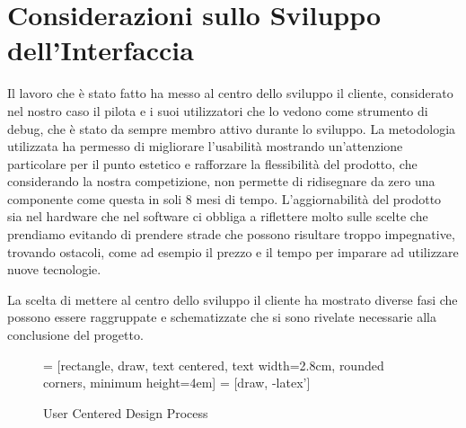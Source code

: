 \newpage


\section{Considerazioni sullo Sviluppo dell'Interfaccia}

Il lavoro che è stato fatto ha messo al centro dello sviluppo il cliente, considerato nel nostro caso il pilota e 
i suoi utilizzatori che lo vedono come strumento di debug, che è stato da sempre membro attivo durante lo sviluppo.
La metodologia utilizzata ha permesso di migliorare l'usabilità mostrando un'attenzione particolare per il punto estetico 
e rafforzare la flessibilità del prodotto, che considerando la nostra competizione, non permette di ridisegnare da zero una componente come questa
in soli 8 mesi di tempo. 
L'aggiornabilità del prodotto sia nel hardware che nel software ci obbliga a riflettere molto sulle scelte che prendiamo
evitando di prendere strade che possono risultare troppo impegnative, trovando ostacoli, come ad esempio il prezzo e
il tempo per imparare ad utilizzare nuove tecnologie.

La scelta di mettere al centro dello sviluppo il cliente ha mostrato diverse fasi che possono essere raggruppate 
e schematizzate che si sono rivelate necessarie alla conclusione del progetto.

\begin{figure}[!hbt]
    \centering
     = [rectangle, draw, text centered, text width=2.8cm, rounded corners, minimum height=4em]
     = [draw, -latex']
            
    \caption{User Centered Design Process}

\end{figure}


